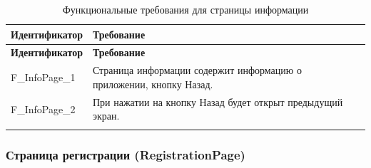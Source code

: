 \documentclass[a4paper, 14pt]{article}
\begin{document}
\begin{longtable}{| p{} | p{} |}
    \hline
    \textbf{Идентификатор}          & \textbf{Требование}                                                                                                                                                                \\
    \hline
    \endfirsthead
    \hline
    \textbf{Идентификатор}          & \textbf{Требование}                                                                                                                                                                \\
    \hline
    \endhead

    F\_InfoPage\_1                  & Страница информации содержит информацию о приложении, кнопку Назад.                                                                                                                \\ \hline
    F\_InfoPage\_2                  & При нажатии на кнопку Назад будет открыт предыдущий экран.                                                                                                                         \\ \hline

    \caption{Функциональные требования для страницы информации}
\end{longtable}

\subsubsection{Страница регистрации (RegistrationPage)}
\end{document}
